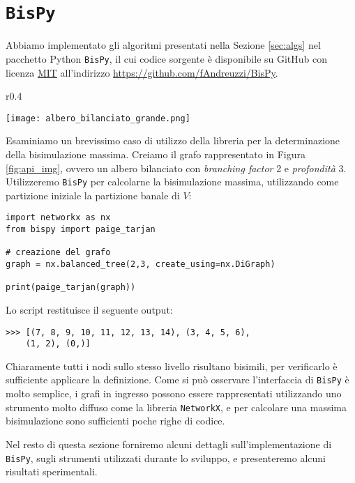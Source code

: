 \section{\texttt{BisPy}}
\label{sec:bispy}
Abbiamo implementato gli algoritmi presentati nella Sezione \ref{sec:algs} nel pacchetto Python \texttt{BisPy}, il cui codice sorgente è disponibile su GitHub con licenza \href{https://github.com/fAndreuzzi/BisPy/blob/master/LICENSE}{MIT} all'indirizzo \href{https://github.com/fAndreuzzi/BisPy}{https://github.com/fAndreuzzi/BisPy}.

\begin{wrapfigure}{r}{0.4\textwidth}
    \vspace{-1cm}
    \begin{center}
        \texttt{[image: albero\_bilanciato\_grande.png]}
    \end{center}
    \caption{}
    \label{fig:api_img}
\end{wrapfigure}
Esaminiamo un brevissimo caso di utilizzo della libreria per la determinazione della bisimulazione massima. Creiamo il grafo rappresentato in Figura \ref{fig:api_img}, ovvero un albero bilanciato con \emph{branching factor} 2 e \emph{profondità} 3. Utilizzeremo \texttt{BisPy} per calcolarne la bisimulazione massima, utilizzando come partizione iniziale la partizione banale di $V$:
\begin{verbatim}
import networkx as nx
from bispy import paige_tarjan

# creazione del grafo
graph = nx.balanced_tree(2,3, create_using=nx.DiGraph)

print(paige_tarjan(graph))
\end{verbatim}
Lo script restituisce il seguente output:
\begin{verbatim}
>>> [(7, 8, 9, 10, 11, 12, 13, 14), (3, 4, 5, 6),
    (1, 2), (0,)]
\end{verbatim}
Chiaramente tutti i nodi sullo stesso livello risultano bisimili, per verificarlo è sufficiente applicare la definizione. Come si può osservare l'interfaccia di \texttt{BisPy} è molto semplice, i grafi in ingresso possono essere rappresentati utilizzando uno strumento molto diffuso come la libreria \texttt{NetworkX}, e per calcolare una massima bisimulazione sono sufficienti poche righe di codice.

Nel resto di questa sezione forniremo alcuni dettagli sull'implementazione di \texttt{BisPy}, sugli strumenti utilizzati durante lo sviluppo, e presenteremo alcuni risultati sperimentali.




